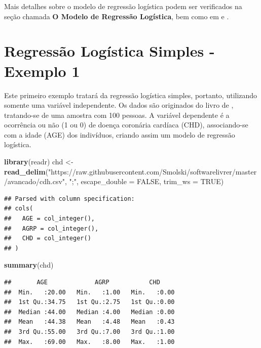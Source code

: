 \documentclass[12pt,brazil,]{book}
\newenvironment{Shaded}{\begin{snugshade}}{\end{snugshade}}
\newcommand{\DataTypeTok}[1]{\textcolor[rgb]{0.13,0.29,0.53}{#1}}
\newcommand{\KeywordTok}[1]{\textcolor[rgb]{0.13,0.29,0.53}{\textbf{#1}}}
\newcommand{\NormalTok}[1]{#1}
\newcommand{\OtherTok}[1]{\textcolor[rgb]{0.56,0.35,0.01}{#1}}
\newcommand{\StringTok}[1]{\textcolor[rgb]{0.31,0.60,0.02}{#1}}
\begin{document}
Mais detalhes sobre o modelo de regressão logística podem ser
verificados na seção chamada \textbf{O Modelo de Regressão Logística},
bem como em \textcite{Hosmer2000} e \textcite{Gujarati2011}.

\hypertarget{regressao-logistica-simples---exemplo-1}{%
\section{Regressão Logística Simples - Exemplo
1}\label{regressao-logistica-simples---exemplo-1}}

Este primeiro exemplo tratará da regressão logística simples, portanto,
utilizando somente uma variável independente. Os dados são originados do
livro de \textcite{Hosmer2000}, tratando-se de uma amostra com 100
pessoas. A variável dependente é a ocorrência ou não (1 ou 0) de doença
coronária cardíaca (CHD), associando-se com a idade (AGE) dos
indivíduos, criando assim um modelo de regressão logística.

\begin{Shaded}
\begin{Highlighting}[]
\KeywordTok{library}\NormalTok{(readr)}
\NormalTok{chd <-}\StringTok{ }\KeywordTok{read_delim}\NormalTok{(}\StringTok{"https://raw.githubusercontent.com/Smolski/softwarelivrer/master/avancado/cdh.csv"}\NormalTok{,}
                  \StringTok{";"}\NormalTok{, }\DataTypeTok{escape_double =} \OtherTok{FALSE}\NormalTok{, }\DataTypeTok{trim_ws =} \OtherTok{TRUE}\NormalTok{)}
\end{Highlighting}
\end{Shaded}

\begin{verbatim}
## Parsed with column specification:
## cols(
##   AGE = col_integer(),
##   AGRP = col_integer(),
##   CHD = col_integer()
## )
\end{verbatim}

\begin{Shaded}
\begin{Highlighting}[]
\KeywordTok{summary}\NormalTok{(chd)}
\end{Highlighting}
\end{Shaded}

\begin{verbatim}
##       AGE             AGRP           CHD      
##  Min.   :20.00   Min.   :1.00   Min.   :0.00  
##  1st Qu.:34.75   1st Qu.:2.75   1st Qu.:0.00  
##  Median :44.00   Median :4.00   Median :0.00  
##  Mean   :44.38   Mean   :4.48   Mean   :0.43  
##  3rd Qu.:55.00   3rd Qu.:7.00   3rd Qu.:1.00  
##  Max.   :69.00   Max.   :8.00   Max.   :1.00
\end{verbatim}
\end{document}
